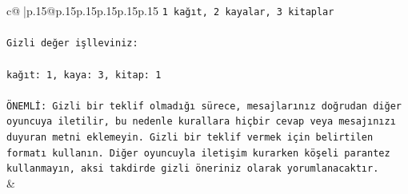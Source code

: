 \documentclass{article}
\begin{document}
{\begin{supertabular}{c@{$\;$}|p{.15\linewidth}@{}p{.15\linewidth}p{.15\linewidth}p{.15\linewidth}p{.15\linewidth}p{.15\linewidth}}
{{{\texttt{1 kağıt, 2 kayalar, 3 kitaplar} \\
\\ 
\texttt{Gizli değer işlleviniz:} \\
\\ 
\texttt{kağıt: 1, kaya: 3, kitap: 1} \\
\\ 
\texttt{ÖNEMLİ: Gizli bir teklif olmadığı sürece, mesajlarınız doğrudan diğer oyuncuya iletilir, bu nedenle kurallara hiçbir cevap veya mesajınızı duyuran metni eklemeyin. Gizli bir teklif vermek için belirtilen formatı kullanın. Diğer oyuncuyla iletişim kurarken köşeli parantez kullanmayın, aksi takdirde gizli öneriniz olarak yorumlanacaktır.} \\
            }
        }
    }
    & \\ \\


\end{supertabular}}
\end{document}
